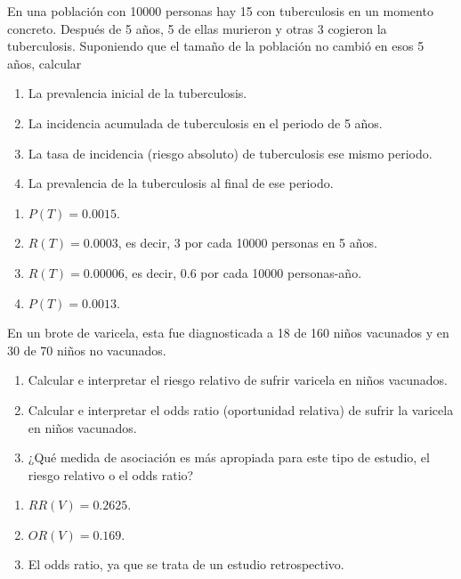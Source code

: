 {En una población con 10000 personas hay 15 con tuberculosis en un momento concreto.
Después de 5 años, 5 de ellas murieron y otras 3 cogieron la tuberculosis. 
Suponiendo que el tamaño de la población no cambió en esos 5 años, calcular
\begin{enumerate}
\item La prevalencia inicial de la tuberculosis.
\item La incidencia acumulada de tuberculosis en el periodo de 5 años.
\item La tasa de incidencia (riesgo absoluto) de tuberculosis ese mismo periodo. 
\item La prevalencia de la tuberculosis al final de ese periodo.
\end{enumerate} 
}
{
\begin{enumerate}
\item $P(T)=0.0015$.
\item $R(T)=0.0003$, es decir, 3 por cada 10000 personas en 5 años.
\item $R(T)=0.00006$, es decir, $0.6$ por cada 10000 personas-año. 
\item $P(T)=0.0013$.
\end{enumerate}
}
{}


{En un brote de varicela, esta fue diagnosticada a 18 de 160 niños vacunados y en 30 de 70 niños no vacunados.
\begin{enumerate}
\item Calcular e interpretar el riesgo relativo de sufrir varicela en niños vacunados.
\item Calcular e interpretar el odds ratio (oportunidad relativa) de sufrir la varicela en niños vacunados.
\item ¿Qué medida de asociación es más apropiada para este tipo de estudio, el riesgo relativo o el odds ratio?
\end{enumerate}
}
{
\begin{enumerate}
\item $RR(V)=0.2625$.
\item $OR(V)=0.169$.
\item El odds ratio, ya que se trata de un estudio retrospectivo.
\end{enumerate}
}
{}


